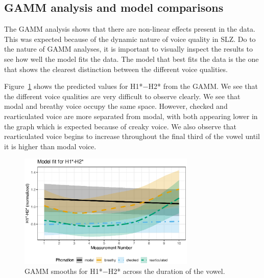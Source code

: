 \subsection{GAMM analysis and model comparisons} \label{sec:GAMM}

The GAMM analysis shows that there are non-linear effects present in the data. This was expected because of the dynamic nature of voice quality in SLZ. Do to the nature of GAMM analyses, it is important to visually inspect the results to see how well the model fits the data. The model that best fits the data is the one that shows the clearest distinction between the different voice qualities.

Figure~\ref{fig:h1h2_model_fit} shows the predicted values for H1*$-$H2* from the GAMM. We see that the different voice qualities are very difficult to observe clearly. We see that modal and breathy voice occupy the same space. However, checked and rearticulated voice are more separated from modal, with both appearing lower in the graph which is expected because of creaky voice. We also observe that rearticulated voice begins to increase throughout the final third of the vowel until it is higher than modal voice. 
\begin{figure}[h!]
  \centering
  \includegraphics[width = 0.75\textwidth]{images/SpectralSlopes_GAMMs/h1h2_model_fit.eps}
  \caption{GAMM smooths for H1*$-$H2* across the duration of the vowel.}
  \label{fig:h1h2_model_fit}
\end{figure}

